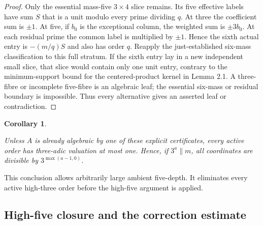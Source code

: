 \documentclass[11pt]{amsart}
\numberwithin{theorem}{section}
\newtheorem{corollary}[theorem]{Corollary}
\theoremstyle{remark}
\numberwithin{equation}{section}
\begin{document}
\begin{proof}
Only the essential mass-five \(3\times4\) slice remains. Its five
effective labels have sum \(S\) that is a unit modulo every prime dividing
\(q\). At three the coefficient sum is \(\pm1\). At five, if \(b_0\)
is the exceptional column, the weighted sum is \(\pm3b_0\). At each
residual prime the common label is multiplied by \(\pm1\). Hence the
sixth actual entry is \(-(m/q)S\) and also has order \(q\). Reapply the
just-established six-mass classification to this full stratum. If the
sixth entry lay in a new independent small slice, that slice would contain
only one unit entry, contrary to the minimum-support bound for the
centered-product kernel in Lemma 2.1. A
three-fibre or incomplete five-fibre is an algebraic leaf; the essential
six-mass or residual boundary is impossible. Thus every alternative gives
an asserted leaf or contradiction.
\end{proof}

\begin{corollary}\label{corollary:7.2}

Unless \(A\) is already algebraic by one of these explicit certificates,
every active order has three-adic valuation at most one. Hence, if
\(3^a\parallel m\), all coordinates are divisible by
\(3^{\max(a-1,0)}\).
\end{corollary}

This conclusion allows arbitrarily large ambient five-depth. It eliminates
every active high-three order before the high-five argument is applied.

\subsection{High-five closure and the correction estimate}\label{sec:7.2}
\end{document}

